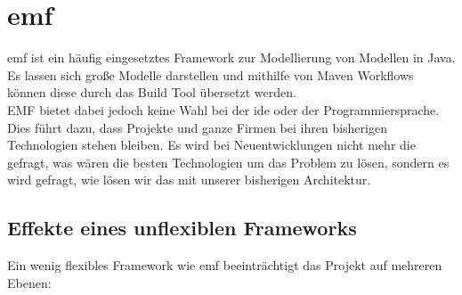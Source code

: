 \documentclass[./einleitung.tex]{subfiles}
\begin{document}
\section{\acrshort{emf}}\label{subsec:emf}
\acrfull{emf} ist ein häufig eingesetztes Framework zur Modellierung von Modellen in Java.
Es lassen sich große Modelle darstellen und mithilfe von Maven Workflows können diese durch das Build Tool übersetzt werden. \\
EMF bietet dabei jedoch keine Wahl bei der \acrshort{ide} oder der Programmiersprache.
Dies führt dazu, dass Projekte und ganze Firmen bei ihren bisherigen Technologien stehen bleiben.
Es wird bei Neuentwicklungen nicht mehr die gefragt, was wären die besten Technologien um das Problem zu lösen, sondern es wird gefragt, wie lösen wir das mit unserer bisherigen Architektur.
\subsection{Effekte eines unflexiblen Frameworks}\label{subsec:effekte-eines-unflexiblen-frameworks}
Ein wenig flexibles Framework wie \acrshort{emf} beeinträchtigt das Projekt auf mehreren Ebenen:
\end{document}
